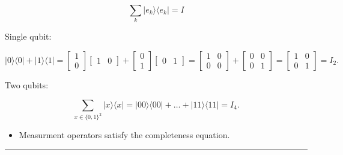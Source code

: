 \[
\boxed{\;
\sum_{k} \lvert e_k\rangle\langle e_k\rvert = I
\;}
\]

Single qubit:

\[
\lvert0\rangle\langle0\rvert + \lvert1\rangle\langle1\rvert
= \begin{bmatrix}1\\0\end{bmatrix} \begin{bmatrix}1&0\end{bmatrix} + \begin{bmatrix}0\\1\end{bmatrix} \begin{bmatrix}0&1\end{bmatrix}
= \begin{bmatrix}1&0\\0&0\end{bmatrix} + \begin{bmatrix}0&0\\0&1\end{bmatrix}  
= \begin{bmatrix}1&0\\0&1\end{bmatrix} = I_{2}.
\]

Two qubits:

\[
\sum_{x\in\{0,1\}^{2}} \lvert x\rangle\langle x\rvert
= \lvert00\rangle\langle00\rvert+\dots+\lvert11\rangle\langle11\rvert
= I_{4}.
\]

\begin{itemize}
\tightlist
\item
  Measurment operators satisfy the completeness equation.
\end{itemize}

\begin{center}\rule{0.5\linewidth}{0.5pt}\end{center}

